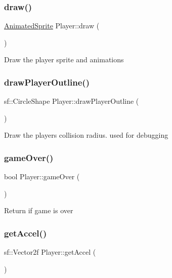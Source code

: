 \subsubsection{\texorpdfstring{draw()}{draw()}}
{\footnotesize\ttfamily \hyperlink{class_animated_sprite}{Animated\+Sprite} Player\+::draw (\begin{DoxyParamCaption}{ }\end{DoxyParamCaption})}

Draw the player sprite and animations \mbox{\label{class_player_ae47cf3c74c1e396d82c3266290871852}} 
\subsubsection{\texorpdfstring{draw\+Player\+Outline()}{drawPlayerOutline()}}
{\footnotesize\ttfamily sf\+::\+Circle\+Shape Player\+::draw\+Player\+Outline (\begin{DoxyParamCaption}{ }\end{DoxyParamCaption})}

Draw the players collision radius. used for debugging \mbox{\label{class_player_a98dff5ba148838f3db6d9934048c33d9}} 
\subsubsection{\texorpdfstring{game\+Over()}{gameOver()}}
{\footnotesize\ttfamily bool Player\+::game\+Over (\begin{DoxyParamCaption}{ }\end{DoxyParamCaption})}

Return if game is over \mbox{\label{class_player_acd90a76e6bf73c5a7d2ff168965c3467}} 
\subsubsection{\texorpdfstring{get\+Accel()}{getAccel()}}
{\footnotesize\ttfamily sf\+::\+Vector2f Player\+::get\+Accel (\begin{DoxyParamCaption}{ }\end{DoxyParamCaption})}

